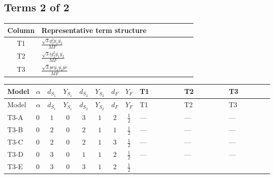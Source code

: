 \documentclass[8pt]{article}
\begin{document}
\begin{landscape}
\subsection*{Terms 2 of 2}
\begin{center}
\begin{tabular}{@{}c >{\raggedright\arraybackslash}p{0.82\linewidth}@{}}
\toprule
Column & Representative term structure \\
\midrule
T1 & \(\displaystyle \frac{\sqrt{3} g_{2}^{2} \overline{y_{1}} \overline{y_{2}}}{MF}\) \\
\midrule
T2 & \(\displaystyle \frac{\sqrt{3} i g_{2}^{2} \overline{y_{1}} \overline{y_{2}}}{MF}\) \\
\midrule
T3 & \(\displaystyle \frac{\sqrt{3} ye \overline{y_{1}} \overline{y_{2}} \overline{ye}}{MF}\) \\
\midrule
\bottomrule
\end{tabular}
\end{center}
\smallskip
\tiny
\begin{longtable}{@{}llcccccc >{\raggedright\arraybackslash}p{0.21\linewidth} >{\raggedright\arraybackslash}p{0.21\linewidth} >{\raggedright\arraybackslash}p{0.21\linewidth}@{}}
\toprule
Model & $\alpha$ & $d_{S_1}$ & $Y_{S_1}$ & $d_{S_2}$ & $Y_{S_2}$ & $d_F$ & $Y_F$ & T1 & T2 & T3 \\
\midrule
\endfirsthead
\toprule
Model & $\alpha$ & $d_{S_1}$ & $Y_{S_1}$ & $d_{S_2}$ & $Y_{S_2}$ & $d_F$ & $Y_F$ & T1 & T2 & T3 \\
\midrule
\endhead
T3-A & $0$ & $1$ & $0$ & $3$ & $1$ & $2$ & $\frac{1}{2}$ & --- & --- & --- \\
\midrule
T3-B & $0$ & $2$ & $0$ & $2$ & $1$ & $1$ & $\frac{1}{2}$ & --- & --- & --- \\
\midrule
T3-C & $0$ & $2$ & $0$ & $2$ & $1$ & $3$ & $\frac{1}{2}$ & --- & --- & --- \\
\midrule
T3-D & $0$ & $3$ & $0$ & $1$ & $1$ & $2$ & $\frac{1}{2}$ & --- & --- & --- \\
\midrule
T3-E & $0$ & $3$ & $0$ & $3$ & $1$ & $2$ & $\frac{1}{2}$ & \scriptsize\adjustbox{max width=\linewidth}{$\begin{gathered} \frac{11 \sqrt{3} g_{2}^{2} \overline{y_{1}} \overline{y_{2}}}{8 MF}\end{gathered}$} & \scriptsize\adjustbox{max width=\linewidth}{$\begin{gathered} - \frac{\sqrt{3} i g_{2}^{2} \overline{y_{1}} \overline{y_{2}}}{6 MF}\end{gathered}$} & \scriptsize\adjustbox{max width=\linewidth}{$\begin{gathered} - \frac{\sqrt{3} ye \overline{y_{1}} \overline{y_{2}} \overline{ye}}{12 MF}\end{gathered}$} \\
\midrule
\bottomrule
\end{longtable}
\clearpage

\end{landscape}
\end{document}
